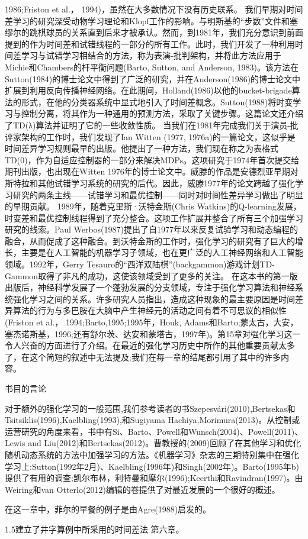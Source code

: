1986;Friston et al.， 1994)，虽然在大多数情况下没有历史联系。
我们早期对时间差学习的研究深受动物学习理论和Klopf工作的影响。与明斯基的“步数”文件和塞缪尔的跳棋球员的关系直到后来才被承认。然而，到1981年，我们充分意识到前面提到的作为时间差和试错线程的一部分的所有工作。此时，我们开发了一种利用时间差学习与试错学习相结合的方法，称为表演-批判架构，并将此方法应用于Michie和Chambers的杆平衡问题(Barto, Sutton, and Anderson, 1983)。该方法在Sutton(1984)的博士论文中得到了广泛的研究，并在Anderson(1986)的博士论文中扩展到利用反向传播神经网络。在此期间，Holland(1986)以他的bucket-brigade算法的形式，在他的分类器系统中显式地引入了时间差概念。Sutton(1988)将时变学习与控制分离，将其作为一种通用的预测方法，采取了关键步骤。这篇论文还介绍了TD(λ)算法并证明了它的一些收敛性质。
当我们在1981年完成我们关于演员-批评家架构的工作时，我们发现了Ian Witten (1977, 1976a)的一篇论文，这似乎是时间差异学习规则最早的出版。他提出了一种方法，我们现在称之为表格式TD(0)，作为自适应控制器的一部分来解决MDPs。这项研究于1974年首次提交给期刊出版，也出现在Witten 1976年的博士论文中。威滕的作品是安德烈亚早期对斯特拉和其他试错学习系统的研究的后代。因此，威滕1977年的论文跨越了强化学习研究的两条主线——试错学习和最优控制——同时对时间性差异学习做出了明显的早期贡献。
1989年，随着克里斯·沃特金斯(Chris Watkins)的Q-learning发展，时变差和最优控制线程得到了充分整合。这项工作扩展并整合了所有三个加强学习研究的线索。Paul Werbos(1987)提出了自1977年以来反复试验学习和动态编程的融合，从而促成了这种融合。到沃特金斯的工作时，强化学习的研究有了巨大的增长，主要是在人工智能的机器学习子领域，也在更广泛的人工神经网络和人工智能领域。1992年，Gerry Tesauro的“西洋双陆棋”(backgammon)游戏计划TD-Gammon取得了非凡的成功，这使该领域受到了更多的关注。
在这本书的第一版出版后，神经科学发展了一个蓬勃发展的分支领域，专注于强化学习算法和神经系统强化学习之间的关系。许多研究人员指出，造成这种现象的最主要原因是时间差异算法的行为与多巴胺在大脑中产生神经元的活动之间有着不可思议的相似性(Friston et al.， 1994;Barto,1995;1995年，Houk, Adams和Barto;蒙太古，大安，塞杰诺斯基，1996;还有舒尔茨、达安和蒙塔古，1997年)。第15章对强化学习这一令人兴奋的方面进行了介绍。在最近的强化学习历史中所作的其他重要贡献太多了，在这个简短的叙述中无法提及;我们在每一章的结尾都引用了其中的许多内容。

书目的言论

对于额外的强化学习的一般范围,我们参考读者的书Szepesvári(2010),Bertsekas和Tsitsiklis(1996),Kaelbling(1993),和Sugiyama Hachiya,Morimura(2013)。从控制或运营研究的角度来看，书中有Si、Barto、Powell和Wunsch(2004)、Powell(2011)、Lewis and Liu(2012)和Bertsekas(2012)。曹教授的(2009)回顾了在其他学习和优化随机动态系统的方法中加强学习的方法。《机器学习》杂志的三期特别集中在强化学习上:Sutton(1992年2月)、Kaelbling(1996年)和Singh(2002年)。Barto(1995年b)提供了有用的调查;凯尔布林，利特曼和摩尔(1996);Keerthi和Ravindran(1997)。由Weiring和van Otterlo(2012)编辑的卷提供了对最近发展的一个很好的概述。

在这一章中，菲尔的早餐的例子是由Agre(1988)启发的。

1.5建立了井字算例中所采用的时间差法
第六章。



